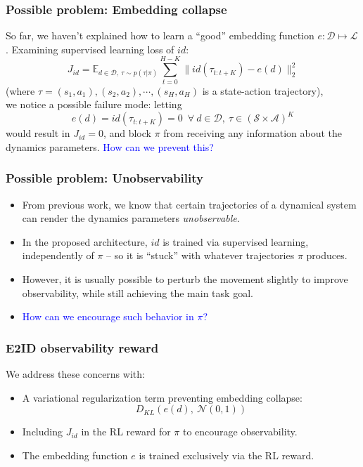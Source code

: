 \documentclass{beamer}
\newcommand{\E}{\mathbb{E}}
\newcommand{\cA}{\mathcal{A}}
\newcommand{\cD}{\mathcal{D}}
\newcommand{\cL}{\mathcal{L}}
\newcommand{\cS}{\mathcal{S}}
\newcommand{\embedfn}{e}
\newcommand{\idfn}{{id}}
\newcommand{\good}[1]{\textcolor{blue}{#1}}
\begin{document}
\begin{frame}
\frametitle{Possible problem: Embedding collapse}
So far, we haven't explained how to learn a ``good'' embedding function $\embedfn : \cD \mapsto \cL$.
Examining supervised learning loss of $\idfn$:
$$
J_\idfn =
\E_{d \in \cD,\ \tau \sim p(\tau|\pi)}
\sum_{t = 0}^{H-K} \| \idfn(\tau_{t:t+K}) - \embedfn(d) \|_2^2
$$
(where $\tau = (s_1, a_1), (s_2, a_2), \cdots, (s_H, a_H)$ is a state-action trajectory), \\
we notice a possible failure mode: letting
$$
e(d) = \idfn(\tau_{t:t+K}) = 0\;\ \forall\ d \in \cD,\ \tau \in (\cS \times \cA)^K
$$
would result in $J_\idfn = 0$, and block $\pi$ from receiving any information about the dynamics parameters.
\good{How can we prevent this?}
\end{frame}

\begin{frame}
\frametitle{Possible problem: Unobservability}
\begin{itemize}
\item From previous work, we know that certain trajectories of a dynamical system
can render the dynamics parameters \emph{unobservable}.
\item In the proposed architecture, $\idfn$ is trained via supervised learning, independently of $\pi$ -- so it is ``stuck'' with whatever trajectories $\pi$ produces.
\item However, it is usually possible to perturb the movement slightly to improve observability,
while still achieving the main task goal.
\item \good{How can we encourage such behavior in $\pi$?}
\end{itemize}
\end{frame}

\begin{frame}
\frametitle{E2ID observability reward}
We address these concerns with:
\begin{itemize}
\item A variational regularization term preventing embedding collapse:
$$
D_{KL} (e(d),\ \mathcal{N}(0, 1))
$$
\item Including $J_\idfn$ in the RL reward for $\pi$ to encourage observability.
\item The embedding function $e$ is trained exclusively via the RL reward.
\end{itemize}
\end{frame}
\end{document}
